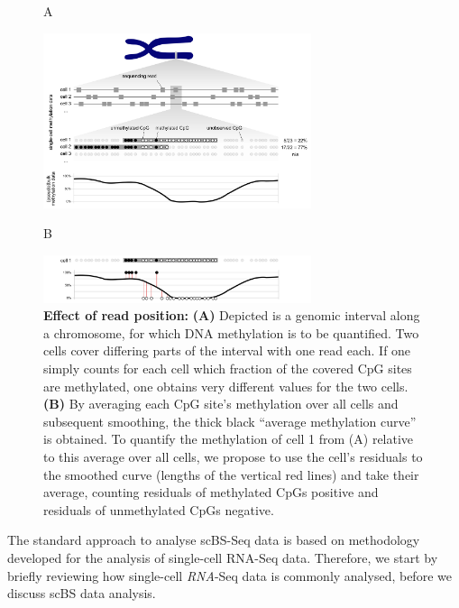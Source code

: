 \documentclass[twocolumn,10pt]{article}
\begin{document}
\begin{figure}[t]
    \hspace{2.5cm}A\\[-7ex]
    \begin{center}
        \includegraphics[width=0.7\textwidth]{figures/Fig_residuals_A.png}\\
    \end{center}
    \hspace{2.5cm}B\\[-3ex]
    \begin{center}
        \includegraphics[width=0.7\textwidth]{figures/Fig_residuals_B.png}
    \end{center}
    \caption{\small \textbf{Effect of read position:} \textbf{(A)} Depicted is a genomic interval along a chromosome, for which DNA methylation is to be quantified. Two cells cover differing parts of the interval with one read each. If one simply counts for each cell which fraction of the covered CpG sites are methylated, one obtains very different values for the two cells. \textbf{(B)} By averaging each CpG site's methylation over all cells and subsequent smoothing, the thick black ``average methylation curve'' is obtained. To quantify the methylation of cell 1 from (A) relative to this average over all cells, we propose to use the cell's residuals to the smoothed curve (lengths of the vertical red lines) and take their average, counting residuals of methylated CpGs positive and residuals of unmethylated CpGs negative.}
    \label{fig:smoothres}
\end{figure}


The standard approach to analyse scBS-Seq data is based on methodology developed for the analysis of single-cell RNA-Seq data. Therefore, we start by briefly reviewing how single-cell \emph{RNA}-Seq data is commonly analysed, before we discuss scBS data analysis.
\end{document}

